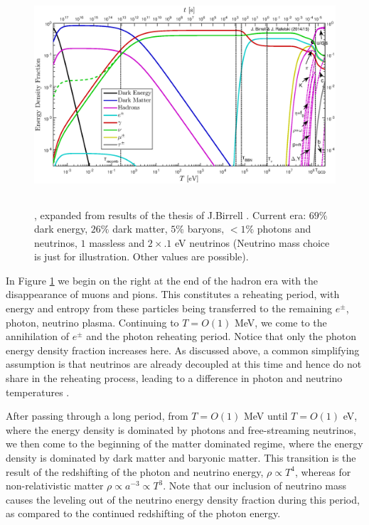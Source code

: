 \begin{figure}
\centerline{\includegraphics[height=8.2cm]{01-introduction/Figures/energy_densities_total.eps}}\label{fig:energy_frac}
\caption{, expanded from results of the thesis of J.Birrell \cite{Birrell:2014ona}. Current era: $69\%$ dark energy, $26\%$ dark matter, $5\%$ baryons, $<1\%$ photons and neutrinos, $1$ massless and $2\times .1$ eV neutrinos (Neutrino mass choice is just for illustration. Other values are possible). }
 \end{figure}
In Figure \ref{fig:energy_frac} we begin on the right at the end of the hadron era with the disappearance of muons and pions. This constitutes a reheating period, with energy and entropy from these particles being transferred to the remaining $e^\pm$, photon, neutrino plasma. Continuing to $T=O(1)$ MeV, we come to the annihilation of $e^\pm$ and the photon reheating period. Notice that only the photon energy density fraction increases here. As discussed above, a common simplifying assumption is that neutrinos are already decoupled at this time and hence do not share in the reheating process, leading to a difference in photon and neutrino temperatures .

After passing through a long period, from $T=O(1)$ MeV until $T=O(1)$ eV, where the energy density is dominated by photons and free-streaming neutrinos, we then come to the beginning of the matter dominated regime, where the energy density is dominated by dark matter and baryonic matter. This transition is the result of the redshifting of the photon and neutrino energy, $\rho\propto T^4$, whereas for non-relativistic matter $\rho\propto a^{-3}\propto T^3$. Note that our inclusion of neutrino mass causes the leveling out of the neutrino energy density fraction during this period, as compared to the continued redshifting of the photon energy.

